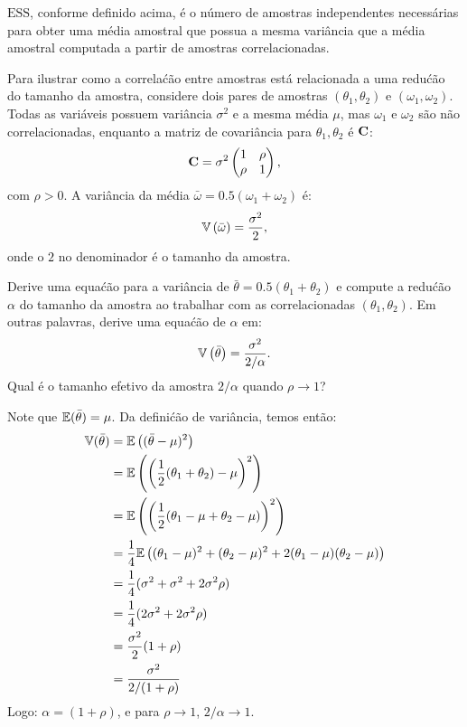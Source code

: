 \begin{exenumerate}
    $\text{ESS}$, conforme definido acima, \'e o n\'umero de amostras independentes
    necess\'arias para obter uma m\'edia amostral que possua a mesma
    vari\^ancia que a m\'edia amostral computada a partir de amostras correlacionadas.
    
    Para ilustrar como a correla\'c\~ao entre amostras est\'a relacionada a
    uma redu\'c\~ao do tamanho da amostra, considere dois pares de amostras $(\theta_1,
    \theta_2)$ e $(\omega_1, \omega_2)$. Todas as vari\'aveis possuem vari\^ancia
    $\sigma^2$ e a mesma m\'edia $\mu$, mas $\omega_1$ e $\omega_2$ s\~ao
    n\~ao correlacionadas, enquanto a matriz de covari\^ancia para $\theta_1, \theta_2$ \'e
    $\mathbf{C}$:
    \begin{equation}
        \mathbf{C} = \sigma^2 \begin{pmatrix}
            1 & \rho \\
            \rho & 1
        \end{pmatrix},
    \end{equation}
    com $\rho>0$. A vari\^ancia da m\'edia $\bar{\omega} = 0.5
    (\omega_1+\omega_2)$ \'e:
    \begin{equation}
        \mathbb{V} \left( \bar{\omega} \right) = \frac{\sigma^2}{2},
    \end{equation}
    onde o $2$ no denominador \'e o tamanho da amostra.
    
    Derive uma equa\'c\~ao para a vari\^ancia de $\bar{\theta} =
    0.5(\theta_1+\theta_2)$ e compute a redu\'c\~ao $\alpha$ do
    tamanho da amostra ao trabalhar com as correlacionadas $(\theta_1,\theta_2)$. Em
    outras palavras, derive uma equa\'c\~ao de $\alpha$ em:
    \begin{equation}
        \mathbb{V} \left(\bar{\theta}\right) = \frac{\sigma^2}{2/\alpha}.
    \end{equation}
    Qual \'e o tamanho efetivo da amostra $2/\alpha$ quando $\rho \to 1$?
    
    \begin{solution}
        
        Note que $\mathbb{E}(\bar{\theta}) = \mu$. Da defini\'c\~ao de
        vari\^ancia, temos ent\~ao:
        \begin{align}
            \mathbb{V}(\bar{\theta}) & = \mathbb{E}\left( (\bar{\theta} - \mu)^2\right)\\
            & = \mathbb{E}\left( \left(\frac{1}{2}(\theta_1+\theta_2) - \mu\right)^2\right) \\
            & =  \mathbb{E}\left( \left(\frac{1}{2}(\theta_1-\mu+\theta_2-\mu)\right)^2\right) \\
            & =  \frac{1}{4} \mathbb{E}\left( (\theta_1-\mu)^2+(\theta_2-\mu)^2 + 2 (\theta_1-\mu) (\theta_2-\mu)\right) \\
            & =  \frac{1}{4} ( \sigma^2 + \sigma^2 + 2 \sigma^2 \rho) \\
            & =  \frac{1}{4} ( 2\sigma^2 + 2 \sigma^2 \rho) \\
            & =  \frac{\sigma^2}{2} ( 1 + \rho) \\
            & =  \frac{\sigma^2}{2/(1+\rho)}
        \end{align}
        Logo: $\alpha = (1+\rho)$, e para $\rho \to 1$, $2/\alpha \to 1$.
        

\end{solution}
\end{exenumerate}
